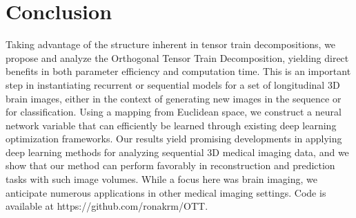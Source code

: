 \section{Conclusion}
\vspace{-5pt}
Taking advantage of the structure inherent in tensor train decompositions, we propose and
analyze the Orthogonal Tensor Train Decomposition, yielding direct benefits in both parameter
efficiency and computation time. This is an important step
in instantiating recurrent or sequential models for a set of longitudinal 3D brain images,
either in the context of generating new images in the sequence or for classification. 
Using a mapping from Euclidean space, we construct a neural network
variable that can efficiently be learned through existing deep learning optimization frameworks.
Our results yield promising
developments in applying 
deep learning methods for analyzing sequential 3D medical imaging data, and
we show that our method can perform favorably in reconstruction and
prediction tasks with such image volumes.
While a focus here was brain imaging,
we anticipate numerous applications in other medical imaging settings.
Code is available at https://github.com/ronakrm/OTT.
